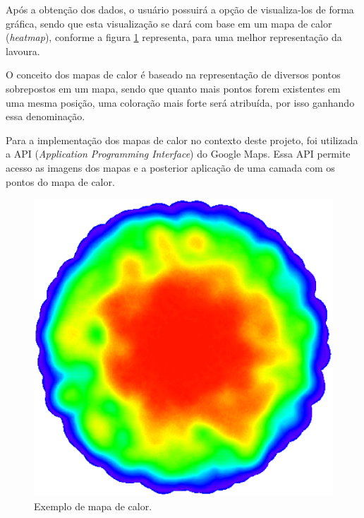   Após a obtenção dos dados, o usuário possuirá a opção de visualiza-los de forma gráfica, sendo que esta visualização se dará
  com base em um mapa de calor (\textit{heatmap}), conforme a figura \ref{fig:heatmap} representa, para uma melhor representação da lavoura.

  O conceito dos mapas de calor é baseado na representação de diversos pontos sobrepostos em um mapa, sendo que quanto mais pontos
  forem existentes em uma mesma posição, uma coloração mais forte será atribuída, por isso ganhando essa denominação.

  Para a implementação dos mapas de calor no contexto deste projeto, foi utilizada a API (\textit{Application Programming Interface})
  do Google Maps. Essa API permite acesso as imagens dos mapas e a posterior aplicação de uma camada com os pontos do mapa de calor.

  \begin{figure}[!htbp]
  \begin{center}
  \includegraphics[width=.5\textwidth]{figuras/heatmap.eps}
  \caption{\label{fig:heatmap}Exemplo de mapa de calor.}
  \end{center}
  \end{figure}

